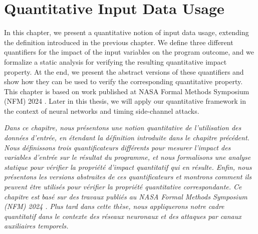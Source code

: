 
\setchapterpreamble[u]{\margintoc}
%


\chapter{Quantitative Input Data Usage}

\marginemptybox{5.8cm}

In this chapter, we present a quantitative notion of input data usage, extending the definition introduced in the previous chapter.
We define three different quantifiers for the impact of the input variables on the program outcome, and we formalize a static analysis for verifying the resulting quantitative impact property.
At the end, we present the abstract versions of these quantifiers and show how they can be used to verify the corresponding quantitative property.
This chapter is based on work published at NASA Formal Methods Symposium (NFM) 2024 .
Later in this thesis, we will apply our quantitative framework in the context of neural networks and timing side-channel attacks.

\frenchdiv

\emph{Dans ce chapitre, nous présentons une notion quantitative de l'utilisation des données d'entrée, en étendant la définition introduite dans le chapitre précédent. Nous définissons trois quantificateurs différents pour mesurer l'impact des variables d'entrée sur le résultat du programme, et nous formalisons une analyse statique pour vérifier la propriété d'impact quantitatif qui en résulte. Enfin, nous présentons les versions abstraites de ces quantificateurs et montrons comment ils peuvent être utilisés pour vérifier la propriété quantitative correspondante. Ce chapitre est basé sur des travaux publiés au NASA Formal Methods Symposium (NFM) 2024 \cite{Mazzucato2024b}. Plus tard dans cette thèse, nous appliquerons notre cadre quantitatif dans le contexte des réseaux neuronaux et des attaques par canaux auxiliaires temporels.}



